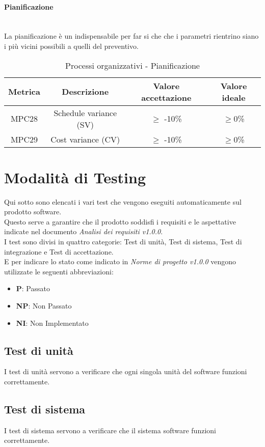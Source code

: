 \documentclass[11pt]{article}
\begin{document}
\begin{justify}
\paragraph{Pianificazione}\mbox{}\\
La pianificazione è un indispensabile per far si che che i parametri rientrino siano i più vicini possibili a quelli del preventivo.\\
\begin{table}[H]
  \centering
\begin{tabular}{|c|c|c|c|}
  \hline
  \textbf{Metrica} & \textbf{Descrizione} & \textbf{Valore accettazione} & \textbf{Valore ideale}\\
  \hline
  MPC28 & Schedule variance (SV) & $\geq$ -10\% & $\geq$0\% \\
  \hline
  MPC29 & Cost variance (CV) & $\geq$ -10\% & $\geq$0\% \\
  \hline
\end{tabular}
\caption{Processi organizzativi - Pianificazione}
\label{tab:pianificazione}
\end{table}

\section{Modalità di Testing}
Qui sotto sono elencati i vari test che vengono eseguiti automaticamente sul prodotto software.\\
Questo serve a garantire che il prodotto soddisfi i requisiti e le aspettative indicate nel documento \textit{Analisi dei requisiti v1.0.0}.\\
I test sono divisi in quattro categorie: Test di unità, Test di sistema, Test di integrazione e Test di accettazione.\\
E per indicare lo stato come indicato in \textit{Norme di progetto v1.0.0} vengono utilizzate le seguenti abbreviazioni:
\begin{itemize}
\item \textbf{P}: Passato
\item \textbf{NP}: Non Passato
\item \textbf{NI}: Non Implementato
\end{itemize}
\subsection{Test di unità}
I test di unità servono a verificare che ogni singola unità del software funzioni correttamente.\\
\subsection{Test di sistema}
I test di sistema servono a verificare che il sistema software funzioni correttamente.\\

\end{justify}
\end{document}
